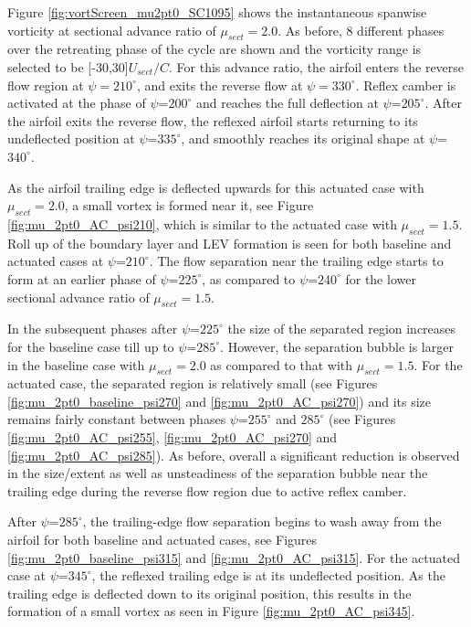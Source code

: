 Figure \ref{fig:vortScreen_mu2pt0_SC1095} shows the instantaneous spanwise vorticity at sectional advance ratio of $\mu_{sect}=2.0$.
As before, 8 different phases over the retreating phase of the cycle are shown and the vorticity range is selected to be [-30,30]$ U_{sect} /C$. For this advance ratio, the airfoil enters the reverse flow region at $\psi=210^\circ$, and exits the reverse flow at $\psi=330^\circ$.
Reflex camber is activated at the phase of $\psi$=$200^\circ$ and reaches the full deflection at $\psi$=$205^\circ$.
After the airfoil exits the reverse flow, the reflexed airfoil starts returning to its undeflected position at $\psi$=$335^\circ$, and smoothly reaches its original shape at $\psi$=$340^\circ$.

As the airfoil trailing edge is deflected upwards for this actuated case with $\mu_{sect}=2.0$, a small vortex is formed near it, see Figure \ref{fig:mu_2pt0_AC_psi210}, which is similar to the actuated case with $\mu_{sect}=1.5$. Roll up of the boundary layer and LEV formation is seen for both baseline and actuated cases at $\psi$=$210^\circ$.
The flow separation near the trailing edge starts to form at an earlier phase of $\psi$=$225^\circ$, as compared to $\psi$=$240^\circ$ for the lower sectional advance ratio of $\mu_{sect}=1.5$.

In the subsequent phases after $\psi$=$225^\circ$ the size of the separated region increases for the baseline case till up to $\psi$=$285^\circ$. However, the separation bubble is larger in the baseline case with $\mu_{sect}=2.0$ as compared to that with $\mu_{sect}=1.5$.
For the actuated case, the separated region is relatively small (see Figures \ref{fig:mu_2pt0_baseline_psi270} and \ref{fig:mu_2pt0_AC_psi270}) and its size remains fairly constant between phases $\psi$=$255^\circ$ and $285^\circ$ (see Figures \ref{fig:mu_2pt0_AC_psi255}, \ref{fig:mu_2pt0_AC_psi270} and \ref{fig:mu_2pt0_AC_psi285}).
As before, overall a significant reduction is observed in the size/extent as well as unsteadiness of the separation bubble near the trailing edge during the reverse flow region due to active reflex camber.

After $\psi$=$285^\circ$, the trailing-edge flow separation begins to wash away from the airfoil for both baseline and actuated cases, see Figures \ref{fig:mu_2pt0_baseline_psi315} and \ref{fig:mu_2pt0_AC_psi315}. 
For the actuated case at $\psi$=$345^\circ$, the reflexed trailing edge is at its undeflected position.
As the trailing edge is deflected down to its original position, this results in the formation of a small vortex as seen in Figure \ref{fig:mu_2pt0_AC_psi345}.

